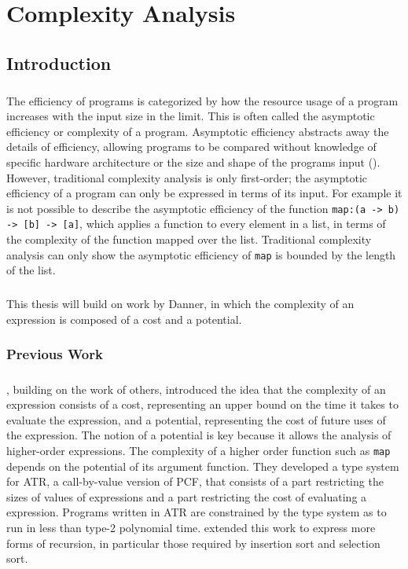 \chapter{Complexity Analysis}

\section{Introduction}
\paragraph{}
The efficiency of programs is categorized by how the resource usage of a program increases with the input size in the limit.
This is often called the asymptotic efficiency or complexity of a program.
Asymptotic efficiency abstracts away the details of efficiency, allowing programs to be compared without knowledge of specific hardware architecture or the size and shape of the programs input (\citet{Cormen2001}).
However, traditional complexity analysis is only first-order; the asymptotic efficiency of a program can only be expressed in terms of its input.
For example it is not possible to describe the asymptotic efficiency of the function \texttt{map:(a -> b) -> [b] -> [a]}, which applies a function to every element in a list, in terms of the complexity of the function mapped over the list.
Traditional complexity analysis can only show the asymptotic efficiency of \texttt{map} is bounded by the length of the list.
\paragraph{}
This thesis will build on work by Danner, in which the complexity of an expression is composed of a cost and a potential.

\subsection*{Previous Work}
\paragraph{}
\citet{Danner2007}, building on the work of others, introduced the idea that the complexity of an expression consists of a cost, representing an upper bound on the time it takes to evaluate the expression, and a potential, representing the cost of future uses of the expression.
The notion of a potential is key because it allows the analysis of higher-order expressions. 
The complexity of a higher order function such as \texttt{map} depends on the potential of its argument function.
They developed a type system for ATR, a call-by-value version of PCF, that consists of a part restricting the sizes of values of expressions and a part restricting the cost of evaluating a expression.
Programs written in ATR are constrained by the type system as to run in less than type-2 polynomial time.
\citet{Danner2009} extended this work to express more forms of recursion, in particular those required by insertion sort and selection sort.


